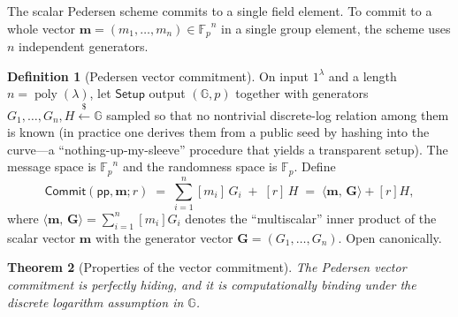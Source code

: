 \documentclass[11pt,a4paper]{article}
\newtheorem{theorem}{Theorem}[section]
\theoremstyle{definition}
\newtheorem{definition}[theorem]{Definition}
\theoremstyle{remark}
\newcommand{\G}{\ensuremath{\mathbb{G}}}
\newcommand{\Fp}{\ensuremath{\mathbb{F}_{p}}}
\newcommand{\ip}[2]{\langle #1,\, #2 \rangle}
\DeclareMathOperator{\poly}{poly}
\begin{document}
The scalar Pedersen scheme commits to a single field element. To commit to a whole vector \(\mathbf{m} = (m_1, \dots, m_n) \in \Fp^n\) in a single group element, the scheme uses \(n\) independent generators.

\begin{definition}[Pedersen vector commitment]\label{commitments:def:pedersen-vector}
On input \(1^\lambda\) and a length \(n = \poly(\lambda)\), let \(\mathsf{Setup}\) output \((\G, p)\) together with generators \(G_1, \dots, G_n, H \xleftarrow{\$} \G\) sampled so that no nontrivial discrete-log relation among them is known (in practice one derives them from a public seed by hashing into the curve---a ``nothing-up-my-sleeve'' procedure that yields a transparent setup). The message space is \(\Fp^n\) and the randomness space is \(\Fp\). Define
\[
  \mathsf{Commit}(\mathsf{pp}, \mathbf{m}; r)
  \;=\; \sum_{i=1}^{n} [m_i]\,G_i \;+\; [r]\,H
  \;=\; \ip{\mathbf{m}}{\mathbf{G}} + [r]H,
\]
where \(\ip{\mathbf{m}}{\mathbf{G}} = \sum_{i=1}^n [m_i]G_i\) denotes the ``multiscalar'' inner product of the scalar vector \(\mathbf{m}\) with the generator vector \(\mathbf{G} = (G_1, \dots, G_n)\). Open canonically.
\end{definition}

\begin{theorem}[Properties of the vector commitment]\label{commitments:thm:vector-props}
The Pedersen vector commitment is perfectly hiding, and it is computationally binding under the discrete logarithm assumption in \(\G\).
\end{theorem}
\end{document}
